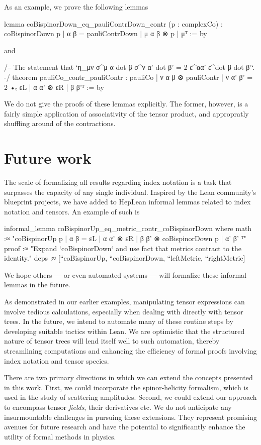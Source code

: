 \documentclass[a4paper, 11pt]{article}
\begin{document}
As an example, we prove the following lemmas
\begin{code}
lemma coBispinorDown_eq_pauliContrDown_contr (p : complexCo) :
  {coBispinorDown p | α β = pauliContrDown | μ α β ⊗ p | μ}ᵀ := by
\end{code}
and 
\begin{code}
/-- The statement that `η_{μν} σ^{μ α dot β} σ^{ν α' dot β'} = 2 ε^{αα'} ε^{dot β dot β'}`. -/
theorem pauliCo_contr_pauliContr :
    {pauliCo | ν α β ⊗ pauliContr | ν α' β' = 2 •ₜ εL | α α' ⊗ εR | β β'}ᵀ := by
\end{code}
We do not give the proofs of these lemmas explicitly. 
The former, however, is a fairly simple application of  associativity of the tensor product, and appropratly shuffling 
around of the contractions. 

\section{Future work} \label{sec:future}
The scale of formalizing all results regarding index notation is a task that surpasses 
the capacity of any single individual. Inspired by the Lean community's 
blueprint projects, we have added to HepLean informal lemmas related to index notation and tensors. 
An example of such is 
\begin{code} 
informal_lemma coBispinorUp_eq_metric_contr_coBispinorDown where
  math :≈ "{coBispinorUp p | α β = εL | α α' ⊗ εR | β β' ⊗ coBispinorDown p | α' β' }ᵀ"
  proof :≈ "Expand `coBispinorDown` and use fact that metrics contract to the identity."
  deps :≈ [``coBispinorUp, ``coBispinorDown, ``leftMetric, ``rightMetric]
\end{code}
We hope others — or even automated systems — will formalize these informal lemmas in the future.

As demonstrated in our earlier examples, manipulating tensor expressions can involve tedious
 calculations, especially when dealing with directly with tensor trees. 
In the future, we intend to automate many of these routine steps by developing suitable tactics 
within Lean. We are optimistic that the structured nature of tensor trees will lend itself well to 
such automation, thereby streamlining computations and enhancing the efficiency of formal proofs
involving index notation and tensor species.

There are two primary directions in which we can extend the concepts presented in this work. 
First, we could incorporate the spinor-helicity formalism, which is used in the study of scattering 
amplitudes. Second, we could extend our approach to encompass tensor \emph{fields}, their derivatives
etc. We do not anticipate any insurmountable challenges in pursuing these extensions. 
They represent promising avenues for future research and have the potential to significantly enhance
the utility of formal methods in physics.



\begin{spacing}{0.5}

\end{spacing}
\end{document}

